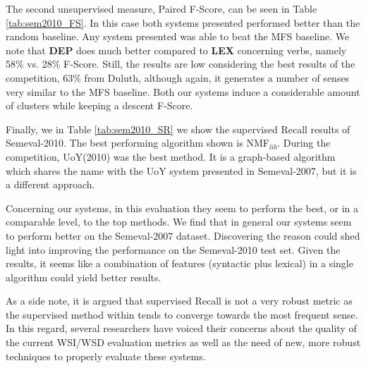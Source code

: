 The second unsupervised measure, Paired F-Score, can be seen in Table \ref{tab:sem2010_FS}. In this case both systems presented performed better than the random baseline. Any system presented was able to beat the MFS baseline. We note that \textbf{DEP} does much better compared to \textbf{LEX} concerning verbs, namely 58\% vs. 28\% F-Score. Still, the results are low considering the best results of the competition, 63\% from Duluth, although again, it generates a number of senses very similar to the MFS baseline. Both our systems induce a considerable amount of clusters while keeping a descent F-Score.

Finally, we in Table \ref{tab:sem2010_SR} we show the supervised Recall results of Semeval-2010. The best performing algorithm shown is NMF$_{lib}$. During the competition, UoY(2010) was the best method. It is a graph-based algorithm which shares the name with the UoY  system presented in Semeval-2007, but it is a different  approach. 

Concerning our systems, in this evaluation they seem to perform the best, or in a comparable level, to the top methods.  We find that in general our systems seem to perform better on the Semeval-2007 dataset. Discovering the reason could shed light into improving the performance on the Semeval-2010 test set. Given the results, it seems like a combination of features (syntactic plus lexical) in  a single algorithm could yield better results. 

As a side note, it is argued that supervised Recall is not a very robust metric as the supervised method within tends to converge towards the most frequent sense. In this regard, several researchers \cite{VandeCruys2011,pedersen2010duluth} have voiced their concerns about the quality of the current WSI/WSD evaluation metrics as well as the need of new, more robust techniques to properly evaluate these systems.



 
